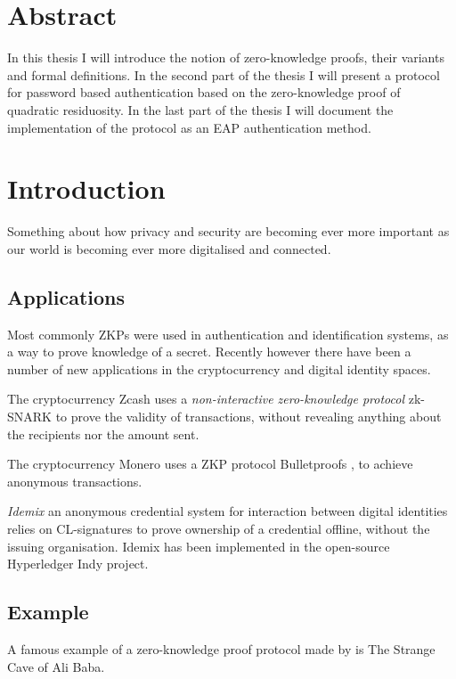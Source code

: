 \section{Abstract}
In this thesis I will introduce the notion of zero-knowledge proofs, their variants and formal definitions.
In the second part of the thesis I will present a protocol for password based authentication based on the zero-knowledge proof of quadratic residuosity.
In the last part of the thesis I will document the implementation of the protocol as an EAP authentication method. %

\newpage

\section{Introduction}
Something about how privacy and security are becoming ever more important as our world is becoming ever more digitalised and connected. %

\subsection{Applications}
Most commonly ZKPs were used in authentication and identification systems, as a way to prove knowledge of a secret. 
Recently however there have been a number of new applications in the cryptocurrency and digital identity spaces.

The cryptocurrency Zcash uses a \textit{non-interactive zero-knowledge protocol} zk-SNARK \cite{bowe2018multi} to prove the validity of transactions, without revealing anything about the recipients nor the amount sent.

The cryptocurrency Monero uses a ZKP protocol Bulletproofs \cite{bunz2018bulletproofs}, to achieve anonymous transactions.

\textit{Idemix} \cite{camenisch2002design} an anonymous credential system for interaction between digital identities relies on CL-signatures \cite{camenisch2001efficient} to prove ownership of a credential offline, without the issuing organisation.
Idemix has been implemented in the open-source Hyperledger Indy project.

\subsection{Example} %
A famous example of a zero-knowledge proof protocol made by \cite{QJM} is The Strange Cave of Ali Baba.

